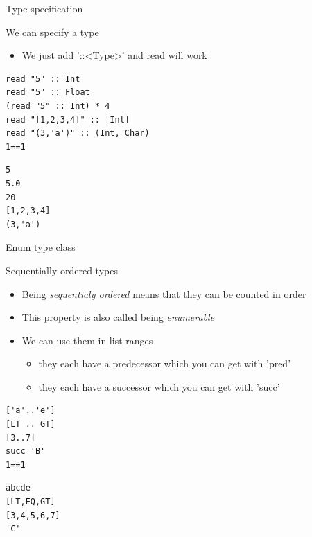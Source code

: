 \documentclass[presetation]{beamer}
\begin{document}
\begin{frame}[fragile,label={sec:orgd8972ab}]{Type specification}
 \begin{block}{We can specify a type}
\begin{itemize}
\item We just add '::<Type>' and read will work
\end{itemize}
\begin{verbatim}
read "5" :: Int
read "5" :: Float
(read "5" :: Int) * 4
read "[1,2,3,4]" :: [Int]
read "(3,'a')" :: (Int, Char)
1==1
\end{verbatim}

\begin{verbatim}
5
5.0
20
[1,2,3,4]
(3,'a')
\end{verbatim}
\end{block}
\end{frame}

\begin{frame}[fragile,label={sec:org41be4d2}]{Enum type class}
 \begin{block}{Sequentially ordered types}
\begin{itemize}
\item Being \emph{sequentialy ordered} means that they can be counted in order
\item This property is also called being \emph{enumerable}
\item We can use them in list ranges
\begin{itemize}
\item they each have a predecessor which you can get with 'pred'
\item they each have a successor which you can get with 'succ'
\end{itemize}
\end{itemize}
\begin{verbatim}
['a'..'e']
[LT .. GT]
[3..7]
succ 'B'
1==1
\end{verbatim}

\begin{verbatim}
abcde
[LT,EQ,GT]
[3,4,5,6,7]
'C'
\end{verbatim}
\end{block}
\end{frame}
\end{document}
